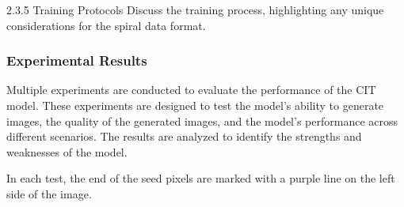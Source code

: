    

    2.3.5 Training Protocols
    Discuss the training process, highlighting any unique considerations for the spiral data format.

    \subsubsection{Experimental Results}

    Multiple experiments are conducted to evaluate the performance of the CIT model. These experiments are designed to test the model's ability to generate images, the quality of the generated images, and the model's performance across different scenarios. The results are analyzed to identify the strengths and weaknesses of the model.
    
    In each test, the end of the seed pixels are marked with a purple line on the left side of the image.
    
